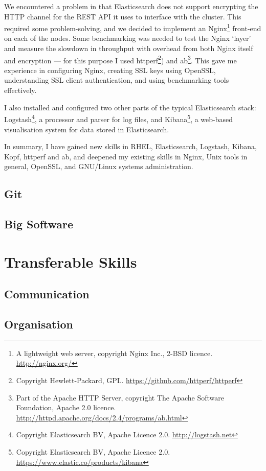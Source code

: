 \documentclass[a4paper,11pt]{article} %
\begin{document}
We encountered a problem in that Elasticsearch does not support encrypting the HTTP channel for the REST API it uses to interface with the cluster.  This required some problem-solving, and we decided to implement an Nginx\footnote{A lightweight web server, copyright Nginx Inc., 2-BSD licence.  \url{http://nginx.org/}} front-end on each of the nodes.  Some benchmarking was needed to test the Nginx `layer' and measure the slowdown in throughput with overhead from both Nginx itself and encryption --- for this purpose I used httperf\footnote{Copyright Hewlett-Packard, GPL.  \url{https://github.com/httperf/httperf}}) and ab\footnote{Part of the Apache HTTP Server, copyright The Apache Software Foundation, Apache 2.0 licence.  \url{http://httpd.apache.org/docs/2.4/programs/ab.html}}.  This gave me experience in configuring Nginx, creating SSL keys using OpenSSL, understanding SSL client authentication, and using benchmarking tools effectively.

I also installed and configured two other parts of the typical Elasticsearch stack: Logstash\footnote{Copyright Elasticsearch BV, Apache Licence 2.0.  \url{http://logstash.net}}, a processor and parser for log files, and Kibana\footnote{Copyright Elasticsearch BV, Apache Licence 2.0.  \url{https://www.elastic.co/products/kibana}}, a web-based visualisation system for data stored in Elasticsearch.

In summary, I have gained new skills in RHEL, Elasticsearch, Logstash, Kibana, Kopf, httperf and ab, and deepened my existing skills in Nginx, Unix tools in general, OpenSSL, and GNU/Linux systems administration.

\subsection{Git}
\label{sec:technical.git}

\subsection{Big Software}
\label{sec:technical.bigsoftware}

\section{Transferable Skills}
\label{sec:transferable}

\subsection{Communication}
\label{sec:transferable.communication}

\subsection{Organisation}
\label{sec:transferable.organisation}
\end{document}
